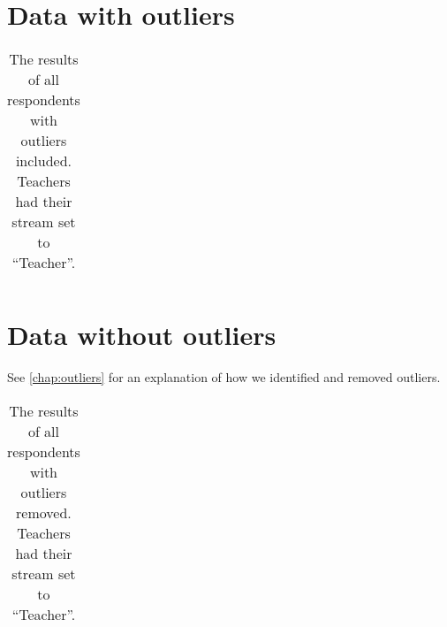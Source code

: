 \section{Data with outliers}
\begin{longtable}{rrrlll}
	\caption{The results of all respondents with outliers included. Teachers had their stream set to ``Teacher''.}
	\label{table:outliers}
	
\end{longtable}

\section{Data without outliers}
See \vref{chap:outliers} for an explanation of how we identified and removed outliers.
\begin{longtable}{rrrlll}
	\caption{The results of all respondents with outliers removed. Teachers had their stream set to ``Teacher''.}
	\label{table:noOutliers}
	
\end{longtable}
